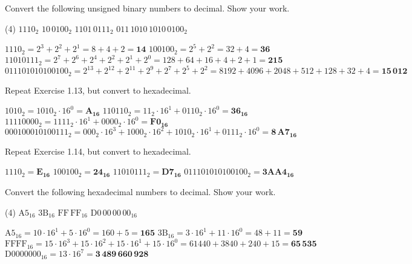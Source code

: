 \exercise %
Convert the following unsigned binary numbers to decimal. Show your work.
\begin{tasks}(4)
	\task $1110_2$
	\task $10\,0100_2$
	\task $1101\,0111_2$
	\task $011\,1010\,1010\,0100_2$
\end{tasks}
\solution
\begin{tasks}
	\task $1110_2 = 2^3 + 2^2 + 2^1 = 8 + 4 + 2 = \mathbf{14}$
	\task $100100_2 = 2^5 + 2^2 = 32 + 4 = \mathbf{36}$
	\task $11010111_2 = 2^7 +2^6+2^4+2^2+2^1 + 2^0 = 128+64+16+4+2+1=\mathbf{215}$
	\task $011101010100100_2 = 2^13+2^12+2^11+2^9+2^7+2^5+ 2^2=8192+
	4096+2048+512+128+32+4=\mathbf{15\,012}$
\end{tasks}

\exercise %
Repeat Exercise 1.13, but convert to hexadecimal.
\solution
\begin{tasks}
	\task $1010_2=1010_2 \cdot 16^0 = \mathbf{A_{16}}$
	\task $110110_2 = 11_2 \cdot 16^1 + 0110_2 \cdot 16^0 = \mathbf{36_{16}}$
	\task $11110000_2 = 1111_2 \cdot 16^1 + 0000_2 \cdot 16^0 = 
	\mathbf{F0_{16}}$
	\task $000100010100111_2 = 000_2 \cdot 16^3 + 1000_2 \cdot 16^2 +
	1010_2 \cdot 16^1 + 0111_2 \cdot 16^0 = \mathbf{8\,A7_{16}}$
\end{tasks}

\exercise %
Repeat Exercise 1.14, but convert to hexadecimal.
\solution
\begin{tasks}
	\task $1110_2 = \mathbf{E_{16}}$
	\task $100100_2 = \mathbf{24_{16}}$
	\task $11010111_2 = \mathbf{D7_{16}}$
	\task $011101010100100_2 = \mathbf{3AA4_{16}}$
\end{tasks}

\exercise %
Convert the following hexadecimal numbers to decimal. Show your work.
\begin{tasks}(4)
	\task $\mathrm{A5}_{16}$
	\task $\mathrm{3B}_{16}$
	\task $\mathrm{FF\,FF}_{16}$
	\task $\mathrm{D0}\,00\,00\,00_{16}$
\end{tasks}
\solution
\begin{tasks}
	\task $\mathrm{A5}_{16} = 10\cdot 16^1 + 5\cdot 16^0 = 160+5 = \mathbf{165}$
	\task $\mathrm{3B}_{16} = 3\cdot 16^1 + 11\cdot 16^0 = 48+11=\mathbf{59}$
	\task $\mathrm{FFFF}_{16} = 15\cdot 16^3 + 15\cdot 16^2 + 15\cdot 16^1 +
	15\cdot 16^0= 61440 + 3840 + 240 + 15 = \mathbf{65\,535}$
	\task $\mathrm{D0000000}_{16} = 13 \cdot 16^7 = \mathbf{3\,489\,660\,928}$
\end{tasks}

